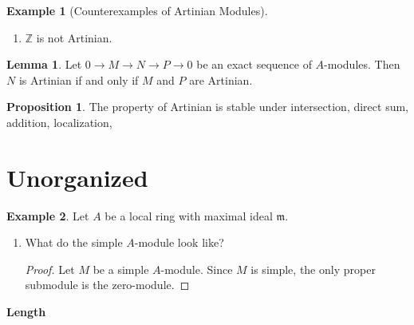\documentclass[a4paper]{book}
\theoremstyle{definition}
\newtheorem{example}{Example}[definition]
\newtheorem{lemma}[definition]{Lemma}
\newtheorem{proposition}[definition]{Proposition}
\begin{document}
\begin{example}[Counterexamples of Artinian Modules]
    \begin{enumerate}
        \item \(\mathbb{Z}\) is not Artinian.
    \end{enumerate}
\end{example}

\begin{thmbox}
    \begin{lemma}
        Let \(0 \rightarrow M \rightarrow N \rightarrow P \rightarrow 0\) be an exact sequence of \(A\)-modules. Then \(N\) is Artinian if and only if \(M\) and \(P\) are Artinian.
    \end{lemma}
\end{thmbox}

\begin{thmbox}
    \begin{proposition}
        The property of Artinian is stable under intersection, direct sum, addition, localization, 
    \end{proposition}
\end{thmbox}


\part*{Unorganized}

\begin{example}
    Let \(A\) be a local ring with maximal ideal \(\mathfrak{m}\).
    \begin{enumerate}
        \item What do the simple \(A\)-module look like?
        
        \begin{proof}
            Let \(M\) be a simple \(A\)-module. Since \(M\) is simple, the only proper submodule is the zero-module.
        \end{proof}
    \end{enumerate}
\end{example}

\textbf{Length}
\end{document}
